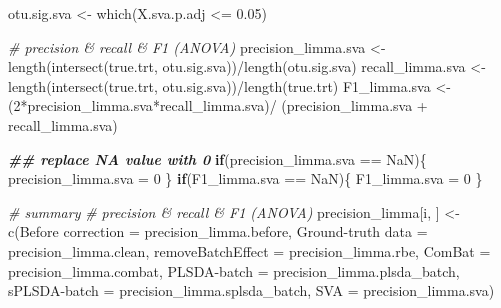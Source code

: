 \documentclass[
]{book}
\newenvironment{Shaded}{\begin{snugshade}}{\end{snugshade}}
\newcommand{\AttributeTok}[1]{\textcolor[rgb]{0.77,0.63,0.00}{#1}}
\newcommand{\CommentTok}[1]{\textcolor[rgb]{0.56,0.35,0.01}{\textit{#1}}}
\newcommand{\ControlFlowTok}[1]{\textcolor[rgb]{0.13,0.29,0.53}{\textbf{#1}}}
\newcommand{\DecValTok}[1]{\textcolor[rgb]{0.00,0.00,0.81}{#1}}
\newcommand{\DocumentationTok}[1]{\textcolor[rgb]{0.56,0.35,0.01}{\textbf{\textit{#1}}}}
\newcommand{\FloatTok}[1]{\textcolor[rgb]{0.00,0.00,0.81}{#1}}
\newcommand{\FunctionTok}[1]{\textcolor[rgb]{0.00,0.00,0.00}{#1}}
\newcommand{\NormalTok}[1]{#1}
\newcommand{\OtherTok}[1]{\textcolor[rgb]{0.56,0.35,0.01}{#1}}
\newcommand{\SpecialCharTok}[1]{\textcolor[rgb]{0.00,0.00,0.00}{#1}}
\newcommand{\StringTok}[1]{\textcolor[rgb]{0.31,0.60,0.02}{#1}}
\begin{document}
\begin{Shaded}
\begin{Highlighting}[]
\NormalTok{  otu.sig.sva }\OtherTok{\textless{}{-}} \FunctionTok{which}\NormalTok{(X.sva.p.adj }\SpecialCharTok{\textless{}=} \FloatTok{0.05}\NormalTok{)}
  
  \CommentTok{\# precision \& recall \& F1 (ANOVA)}
\NormalTok{  precision\_limma.sva }\OtherTok{\textless{}{-}} 
    \FunctionTok{length}\NormalTok{(}\FunctionTok{intersect}\NormalTok{(true.trt, otu.sig.sva))}\SpecialCharTok{/}\FunctionTok{length}\NormalTok{(otu.sig.sva)}
\NormalTok{  recall\_limma.sva }\OtherTok{\textless{}{-}} 
    \FunctionTok{length}\NormalTok{(}\FunctionTok{intersect}\NormalTok{(true.trt, otu.sig.sva))}\SpecialCharTok{/}\FunctionTok{length}\NormalTok{(true.trt)}
\NormalTok{  F1\_limma.sva }\OtherTok{\textless{}{-}}\NormalTok{ (}\DecValTok{2}\SpecialCharTok{*}\NormalTok{precision\_limma.sva}\SpecialCharTok{*}\NormalTok{recall\_limma.sva)}\SpecialCharTok{/}
\NormalTok{    (precision\_limma.sva }\SpecialCharTok{+}\NormalTok{ recall\_limma.sva)}
  
  \DocumentationTok{\#\# replace NA value with 0}
  \ControlFlowTok{if}\NormalTok{(precision\_limma.sva }\SpecialCharTok{==} \StringTok{\textquotesingle{}NaN\textquotesingle{}}\NormalTok{)\{}
\NormalTok{    precision\_limma.sva }\OtherTok{=} \DecValTok{0}
\NormalTok{  \}}
  \ControlFlowTok{if}\NormalTok{(F1\_limma.sva }\SpecialCharTok{==} \StringTok{\textquotesingle{}NaN\textquotesingle{}}\NormalTok{)\{}
\NormalTok{    F1\_limma.sva }\OtherTok{=} \DecValTok{0}
\NormalTok{  \}}
  
  
  \CommentTok{\# summary}
  \CommentTok{\# precision \& recall \& F1 (ANOVA)}
\NormalTok{  precision\_limma[i, ] }\OtherTok{\textless{}{-}} \FunctionTok{c}\NormalTok{(}\StringTok{\textasciigrave{}}\AttributeTok{Before correction}\StringTok{\textasciigrave{}} \OtherTok{=}\NormalTok{ precision\_limma.before, }
                            \StringTok{\textasciigrave{}}\AttributeTok{Ground{-}truth data}\StringTok{\textasciigrave{}} \OtherTok{=}\NormalTok{ precision\_limma.clean,}
                            \StringTok{\textasciigrave{}}\AttributeTok{removeBatchEffect}\StringTok{\textasciigrave{}} \OtherTok{=}\NormalTok{ precision\_limma.rbe,}
                            \AttributeTok{ComBat =}\NormalTok{ precision\_limma.combat,}
                            \StringTok{\textasciigrave{}}\AttributeTok{PLSDA{-}batch}\StringTok{\textasciigrave{}} \OtherTok{=}\NormalTok{ precision\_limma.plsda\_batch,}
                            \StringTok{\textasciigrave{}}\AttributeTok{sPLSDA{-}batch}\StringTok{\textasciigrave{}} \OtherTok{=}\NormalTok{ precision\_limma.splsda\_batch,}
                            \AttributeTok{SVA =}\NormalTok{ precision\_limma.sva)}
  

\end{Highlighting}
\end{Shaded}
\end{document}
